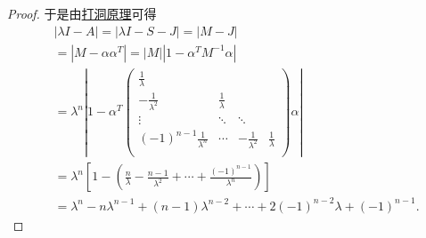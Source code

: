 \documentclass[../../main.tex]{subfiles}%
\begin{document}
\begin{proof}
于是由\hyperref[proposition:打洞原理]{打洞原理}可得
\begin{align*}
&\left| \lambda I-A \right|=\left| \lambda I-S-J \right|=\left| M-J \right|
\\
&=\left| M-\alpha \alpha ^T \right|=\left| M \right|\left| 1-\alpha ^TM^{-1}\alpha \right|
\\
&=\lambda^n\left| 1-\alpha ^T\left( \begin{matrix}
\frac{1}{\lambda}&		&		&		\\
-\frac{1}{\lambda^2}&		\frac{1}{\lambda}&		&		\\
\vdots&		\ddots&		\ddots&		\\
(-1)^{n-1}\frac{1}{\lambda^n}&		\cdots&		-\frac{1}{\lambda^2}&		\frac{1}{\lambda}\\
\end{matrix} \right) \alpha \right|
\\
&=\lambda^n\left[ 1-\left( \frac{n}{\lambda}-\frac{n-1}{\lambda^2}+\cdots +\frac{\left( -1 \right) ^{n-1}}{\lambda^n} \right) \right] 
\\
&=\lambda^n-n\lambda^{n-1}+\left( n-1 \right) \lambda^{n-2}+\cdots +2\left( -1 \right) ^{n-2}\lambda+\left( -1 \right) ^{n-1}.
\end{align*}
\end{proof}
\end{document}
